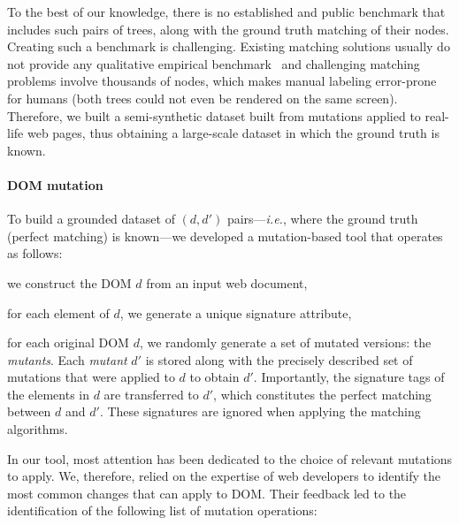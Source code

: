 To the best of our knowledge, there is no established and public benchmark that includes such pairs of trees, along with the ground truth matching of their nodes. Creating such a benchmark is challenging.
Existing matching solutions usually do not provide any qualitative empirical benchmark~\cite{Bunke1998ASubgraph,Dinitz1998OnIsomorphism, jiang1994alignment,valiente2001efficient,Wang2001FindingHierarchy,zhang1995algorithms} and challenging matching problems involve thousands of nodes, which makes manual labeling error-prone for humans (both trees could not even be rendered on the same screen).
Therefore, we built a semi-synthetic dataset built from mutations applied to real-life web pages, thus obtaining a large-scale dataset in which the ground truth is known.

\paragraph{DOM mutation}
To build a grounded dataset of $(d,d')$ pairs---\emph{i.e.}, where the ground truth (perfect matching) is known---we developed a mutation-based tool that operates as follows:
\begin{compactenum}
	\item we construct the DOM $d$ from an input web document,
    \item for each element of $d$, we generate a unique signature attribute,
    \item for each original DOM $d$, we randomly generate a set of mutated versions: the \textit{mutants}.
    Each \textit{mutant} $d'$ is stored along with the precisely described set of mutations that were applied to $d$ to obtain $d'$.
    Importantly, the signature tags of the elements in $d$ are transferred to $d'$, which constitutes the perfect matching between $d$ and $d'$. These signatures are ignored when applying the matching algorithms.
\end{compactenum}

In our tool, most attention has been dedicated to the choice of relevant mutations to apply.
We, therefore, relied on the expertise of web developers to identify the most common changes that can apply to DOM.
Their feedback led to the identification of the following list of mutation operations:

